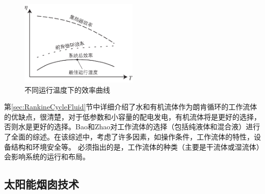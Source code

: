 \begin{figure}[!ht]
\centering 
\includegraphics[width=0.5\textwidth]{fig/Efficiency}
\caption{不同运行温度下的效率曲线}\label{fig:Efficiency}
\end{figure}

第\ref{sec:RankineCycleFluid}节中详细介绍了水和有机流体作为朗肯循环的工作流体的优缺点，很清楚，对于低参数和小容量的配电发电，有机流体将是更好的选择，否则水是更好的选择。Bao和Zhao\cite{Bao2013}对工作流体的选择（包括纯液体和混合液）进行了全面的综述。在该综述中，考虑了许多因素，如操作条件，工作流体的特性，设备结构和环境安全等。
必须指出的是，工作流体的种类（主要是干流体或湿流体）会影响系统的运行和布局。

\subsection{太阳能烟囱技术}

